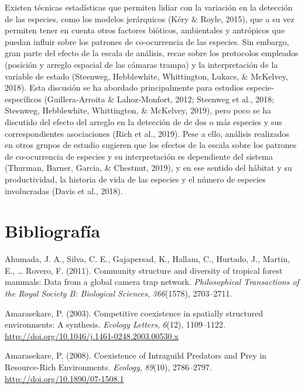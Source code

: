 \documentclass[12pt,twoside]{reedthesis}
\begin{document}
Existen técnicas estadísticas que permiten lidiar con la variación en la detección de las especies, como los modelos jerárquicos (Kéry \& Royle, 2015), que a su vez permiten tener en cuenta otros factores bióticos, ambientales y antrópicos que puedan influir sobre los patrones de co-ocurrencia de las especies. Sin embargo, gran parte del efecto de la escala de análisis, recae sobre los protocolos empleados (posición y arreglo espacial de las cámaras trampa) y la interpretación de la variable de estado (Steenweg, Hebblewhite, Whittington, Lukacs, \& McKelvey, 2018). Esta discusión se ha abordado principalmente para estudios especie-específicos (Guillera‐Arroita \& Lahoz‐Monfort, 2012; Steenweg et al., 2018; Steenweg, Hebblewhite, Whittington, \& McKelvey, 2019), pero poco se ha discutido del efecto del arreglo en la detección de de dos o más especies y sus correspondientes asociaciones (Rich et al., 2019). Pese a ello, análisis realizados en otros grupos de estudio sugieren que los efectos de la escala sobre los patrones de co-ocurrencia de especies y su interpretación es dependiente del sistema (Thurman, Barner, Garcia, \& Chestnut, 2019), y en ese sentido del hábitat y su productividad, la historia de vida de las especies y el número de especies involucradas (Davis et al., 2018).

\hypertarget{bibliografuxeda}{%
\section{Bibliografía}\label{bibliografuxeda}}

\hypertarget{refs}{}
\leavevmode\hypertarget{ref-ahumada_community_2011}{}%
Ahumada, J. A., Silva, C. E., Gajapersad, K., Hallam, C., Hurtado, J., Martin, E., \ldots{} Rovero, F. (2011). Community structure and diversity of tropical forest mammals: Data from a global camera trap network. \emph{Philosophical Transactions of the Royal Society B: Biological Sciences}, \emph{366}(1578), 2703--2711.

\leavevmode\hypertarget{ref-amarasekare_competitive_2003}{}%
Amarasekare, P. (2003). Competitive coexistence in spatially structured environments: A synthesis. \emph{Ecology Letters}, \emph{6}(12), 1109--1122. \url{http://doi.org/10.1046/j.1461-0248.2003.00530.x}

\leavevmode\hypertarget{ref-amarasekare_coexistence_2008}{}%
Amarasekare, P. (2008). Coexistence of Intraguild Predators and Prey in Resource-Rich Environments. \emph{Ecology}, \emph{89}(10), 2786--2797. \url{http://doi.org/10.1890/07-1508.1}
\end{document}
